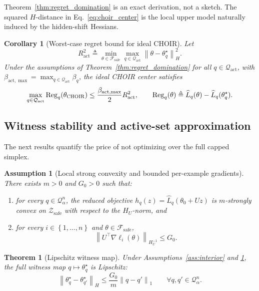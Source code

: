 \documentclass{article}
\newtheorem{theorem}{Theorem}
\newtheorem{corollary}{Corollary}
\newtheorem{assumption}{Assumption}
\newcommand{\cF}{\mathcal{F}}
\newcommand{\cQ}{\mathcal{Q}}
\newcommand{\cZ}{\mathcal{Z}}
\newcommand{\Reg}{\operatorname{Reg}}
\newcommand{\loss}{\ell}
\newcommand{\choir}{\textup{\textsc{CHOIR}}}
\newcommand{\norm}[1]{\left\lVert #1 \right\rVert}
\newcommand{\braces}[1]{\left\{ #1 \right\}}
\newcommand{\safe}{\mathrm{safe}}
\newcommand{\act}{\mathrm{act}}
\begin{document}
Theorem~\ref{thm:regret_domination} is an exact derivation, not a sketch. The squared \(H\)-distance in Eq.~\eqref{eq:choir_center} is the local upper model naturally induced by the hidden-shift Hessians.

\begin{corollary}[Worst-case regret bound for ideal \choir{}]
\label{cor:ideal_regret}
Let
\[
R_\act^2
\triangleq
\min_{\theta\in\cF_{\safe}}
\max_{q\in\cQ_{\act}}
\norm{\theta-\theta_q^\star}_H^2.
\]
Under the assumptions of Theorem~\ref{thm:regret_domination} for all \(q\in\cQ_{\act}\), with \(\beta_{\act,\max}=\max_{q\in\cQ_{\act}}\beta_q\), the ideal \choir{} center satisfies
\[
\max_{q\in\cQ_{\act}}
\Reg_q(\theta_{\choir})
\le
\frac{\beta_{\act,\max}}{2} R_\act^2,
\qquad
\Reg_q(\theta)
\triangleq
\widehat L_q(\theta)-\widehat L_q(\theta_q^\star).
\]
\end{corollary}

\subsection{Witness stability and active-set approximation}

The next results quantify the price of not optimizing over the full capped simplex.

\begin{assumption}[Local strong convexity and bounded per-example gradients]
\label{ass:strong}
There exists \(m>0\) and \(G_0>0\) such that:
\begin{enumerate}[label=(\roman*),leftmargin=1.4em]
    \item for every \(q\in\cQ_\alpha^n\), the reduced objective \(h_q(z)=\widehat L_q(\theta_0+Uz)\) is \(m\)-strongly convex on \(\cZ_{\safe}\) with respect to the \(H_U\)-norm, and
    \item for every \(i\in\braces{1,\ldots,n}\) and \(\theta\in\cF_{\safe}\),
    \[
    \norm{U^\top \nabla \loss_i(\theta)}_{H_U^{-1}} \le G_0.
    \]
\end{enumerate}
\end{assumption}

\begin{theorem}[Lipschitz witness map]
\label{thm:witness_lipschitz}
Under Assumptions~\ref{ass:interior} and \ref{ass:strong}, the full witness map \(q\mapsto \theta_q^\star\) is Lipschitz:
\begin{equation}
\norm{\theta_q^\star-\theta_{q'}^\star}_H
\le
\frac{G_0}{m}\norm{q-q'}_1
\qquad
\forall q,q'\in\cQ_\alpha^n.
\label{eq:witness_lipschitz}
\end{equation}
\end{theorem}
\end{document}
